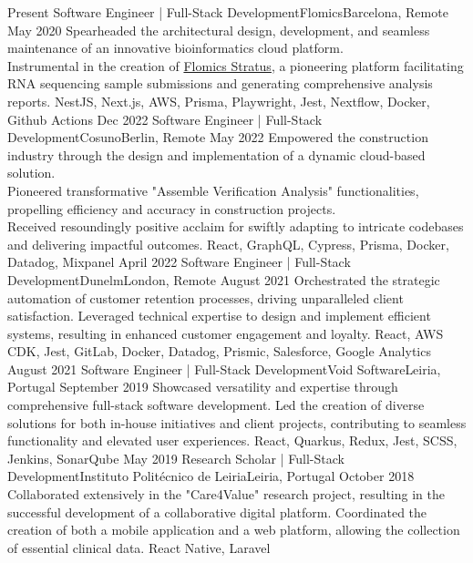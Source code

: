 %
%
%
\vspace{0.5em}
\begin{experiences}
  \experience
  {Present} {Software Engineer | Full-Stack Development}{Flomics}{Barcelona, Remote}
  {May 2020}    {Spearheaded the architectural design, development, and seamless maintenance of an 
  innovative bioinformatics cloud platform. \\Instrumental in the creation of 
  \href{https://cloud.flomics.com}{Flomics Stratus}, a pioneering platform facilitating RNA sequencing 
  sample submissions and generating comprehensive analysis reports.}
  {NestJS, Next.js, AWS, Prisma, Playwright, Jest, Nextflow, Docker, Github Actions}
  \emptySeparator
  \experience
  {Dec 2022} {Software Engineer | Full-Stack Development}{Cosuno}{Berlin, Remote}
  {May 2022} {Empowered the construction industry through the design and implementation of a dynamic cloud-based 
  solution. \\Pioneered transformative "Assemble Verification Analysis" functionalities, propelling efficiency 
  and accuracy in construction projects. \\Received resoundingly positive acclaim for swiftly adapting to intricate 
  codebases and delivering impactful outcomes.}
  {React, GraphQL, Cypress, Prisma, Docker, Datadog, Mixpanel}
  \emptySeparator
  \experience
  {April 2022}   {Software Engineer | Full-Stack Development}{Dunelm}{London, Remote}
  {August 2021} {Orchestrated the strategic automation of customer retention processes, driving 
  unparalleled client satisfaction. Leveraged technical expertise to design and implement efficient systems, 
  resulting in enhanced customer engagement and loyalty.}
  {React,  AWS CDK, Jest, GitLab, Docker, Datadog, Prismic, Salesforce, Google Analytics}
  \emptySeparator
  \experience
  {August 2021}     {Software Engineer | Full-Stack Development}{Void Software}{Leiria, Portugal}
  {September 2019}    {Showcased versatility and expertise through comprehensive full-stack software development. 
  Led the creation of diverse solutions for both in-house initiatives and client projects, 
  contributing to seamless functionality and elevated user experiences.}
  {React, Quarkus, Redux, Jest, SCSS, Jenkins, SonarQube}
  \emptySeparator
  \experience
  {May 2019}     {Research Scholar | Full-Stack Development}{Instituto Politécnico de Leiria}{Leiria, Portugal}
  {October 2018}    {Collaborated extensively in the "Care4Value" research project, 
  resulting in the successful development of a collaborative digital platform. 
  Coordinated the creation of both a mobile application and a web platform, 
  allowing the collection of essential clinical data.}
  {React Native, Laravel}
\end{experiences}